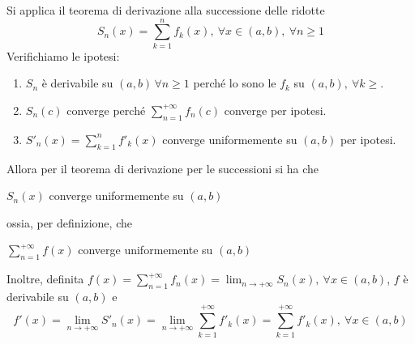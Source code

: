 \begin{demonstration}
	Si applica il teorema di derivazione alla successione delle ridotte
	\begin{equation*}
		S_n\left(x\right)=\sum_{k=1}^{n}f_k\left(x\right),\ \forall x\in\left(a,b\right),\ \forall n\geq 1
	\end{equation*}
Verifichiamo le ipotesi:
\begin{enumerate}
	\item $S_n$ è derivabile su $\left(a,b\right)\, \forall n\geq 1$ perché lo sono le $f_k$ su $\left(a,b\right),\ \forall k\geq $.
	\item $S_n\left(c\right)$ converge perché $\displaystyle\sum_{n=1}^{+\infty}f_n\left(c\right)$ converge per ipotesi.
	\item $S'_n\left(x\right)=\sum_{k=1}^{n}f'_k\left(x\right)$ converge uniformemente su $\left(a,b\right)$ per ipotesi.
\end{enumerate}
Allora per il teorema di derivazione per le successioni si ha che
\begin{center}
	$S_n\left(x\right)$ converge uniformemente su $\left(a,b\right)$
\end{center}
ossia, per definizione, che
\begin{center}
	$\sum_{n=1}^{+\infty}f\left(x\right)$ converge uniformemente su $\left(a,b\right)$
\end{center}
Inoltre, definita $\displaystyle f\left(x\right)=\sum_{n=1}^{+\infty}f_n\left(x\right)=\lim_{n\to+\infty}S_n\left(x\right),\ \forall x\in\left(a,b\right)$, $f$ è derivabile su $\left(a,b\right)$ e
\begin{equation*}
	f'\left(x\right)=\lim_{n\to+\infty}S'_n\left(x\right)=\lim_{n\to+\infty}\sum_{k=1}^{+\infty}f'_k\left(x\right)=\sum_{k=1}^{+\infty}f'_k\left(x\right),\ \forall x\in\left(a,b\right)
\end{equation*}
\end{demonstration}